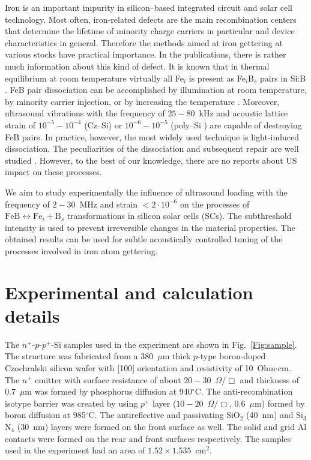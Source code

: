 \documentclass[%
 aip,jap,
 amsmath,amssymb,
 reprint,%
]{revtex4-1}
\begin{document}
Iron is an important impurity in silicon--based integrated circuit and solar cell technology.
Most often, iron-related defects are the main recombination centers that determine the lifetime of  minority charge carriers in particular and device characteristics in general.
Therefore the methods aimed at iron gettering at various stocks have practical importance.
In the publications, there is rather much information about this kind of defect.
It is known that in thermal equilibrium at room temperature virtually all Fe$_i$ is present as Fe$_i$B$_s$ pairs in Si:B \cite{FeBLight2,FeBJAP2005}.
FeB pair dissociation can be accomplished by illumination at room temperature, by minority carrier injection, or by increasing the temperature \cite{FeBLight2,FeBAssJAP2014,FeB_Zong}.
Moreover, ultrasound  vibrations with the frequency of $25-80$~kHz and acoustic lattice strain of $10^{-5}-10^{-4}$ (Cz--Si\cite{Ostapenko1995})
or $10^{-6}-10^{-5}$ (poly--Si \cite{Ostapenko1995SST,Ostapenko1994APL}) are capable of destroying FeB pairs.
In practice, however, the most widely used technique is light-induced dissociation.
The peculiarities of the dissociation and subsequent repair are well studied \cite{FeBLight2,FeBKin2019,FeBAssJAP2014,FeBJAP2005,FeBAssSST2011,lauer2016,FeBStrongIll,FeBkinAPL2008,FeBKinAPL2013}. However, to the best of our knowledge, there are no reports about US impact on these processes.

We aim  to study experimentally the influence of ultrasound loading with the
frequency of $2-30$~MHz and  strain $<2\cdot10^{-6}$ on the
processes of $\mathrm{FeB}\leftrightarrow\mathrm{Fe}_i+\mathrm{B}_s$ transformations in silicon solar cells (SCs).
The subthreshold intensity is used to prevent irreversible changes in the material properties.
The obtained results can be used for subtle acoustically controlled tuning of the processes involved in iron atom gettering.

\section{\label{sec:Exp}Experimental and calculation details}


The $n^+$-$p$-$p^+$-Si samples used in the experiment are shown in Fig.~\ref{Fig:sample}.
The structure was fabricated from a 380~$\mu$m thick $p$-type boron-doped
Czochralski silicon wafer with [100] orientation and resistivity of 10~Ohm$\cdot$cm.
The $n^+$ emitter with surface resistance of about $20-30$~$\Omega/\Box$
and  thickness of $0.7$~$\mu$m was formed by phosphorus diffusion at 940$^\circ$C.
The anti-recombination isotype barrier was created by using $p^+$
layer ($10-20$~$\Omega/\Box$, $0.6$~$\mu$m) formed by boron diffusion at 985$^\circ$C.
The antireflective and passivating SiO$_2$ (40~nm) and Si$_3$N$_4$ (30~nm) layers
were formed on the front surface as well.
The solid and grid Al contacts were formed on the rear and front surfaces respectively.
The samples used in the experiment had an area of $1.52\times1.535$~cm$^2$.
\end{document}
